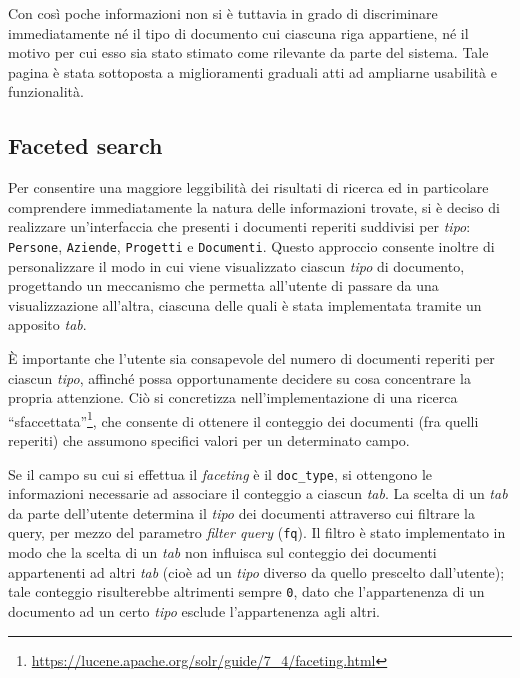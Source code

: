 Con così poche informazioni non si è tuttavia in grado di discriminare immediatamente né il tipo di documento cui ciascuna riga appartiene, né il motivo per cui esso sia stato stimato come rilevante da parte del sistema. Tale pagina è stata sottoposta a miglioramenti graduali atti ad ampliarne usabilità e funzionalità.


\subsection{Faceted search}

Per consentire una maggiore leggibilità dei risultati di ricerca ed in particolare comprendere immediatamente la natura delle informazioni trovate, si è deciso di realizzare un’interfaccia che presenti i documenti reperiti suddivisi per \textit{tipo}: \texttt{Persone}, \texttt{Aziende}, \texttt{Progetti} e \texttt{Documenti}. Questo approccio consente inoltre di personalizzare il modo in cui viene visualizzato ciascun \textit{tipo} di documento, progettando un meccanismo che permetta all’utente di passare da una visualizzazione all’altra, ciascuna delle quali è stata implementata tramite un apposito \textit{tab}.

\vspace{1em}

È importante che l’utente sia consapevole del numero di documenti reperiti per ciascun \textit{tipo}, affinché possa opportunamente decidere su cosa concentrare la propria attenzione. Ciò si concretizza nell’implementazione di una ricerca “sfaccettata”\footnote{\url{https://lucene.apache.org/solr/guide/7_4/faceting.html}}, che consente di ottenere il conteggio dei documenti (fra quelli reperiti) che assumono specifici valori per un determinato campo.

Se il campo su cui si effettua il \textit{faceting} è il \texttt{doc\_type}, si ottengono le informazioni necessarie ad associare il conteggio a ciascun \textit{tab}. La scelta di un \textit{tab} da parte dell’utente determina il \textit{tipo} dei documenti attraverso cui filtrare la query, per mezzo del parametro \textit{filter query} (\texttt{fq}). Il filtro è stato implementato in modo che la scelta di un \textit{tab} non influisca sul conteggio dei documenti appartenenti ad altri \textit{tab} (cioè ad un \textit{tipo} diverso da quello prescelto dall'utente); tale conteggio risulterebbe altrimenti sempre \texttt{0}, dato che l’appartenenza di un documento ad un certo \textit{tipo} esclude l’appartenenza agli altri.

